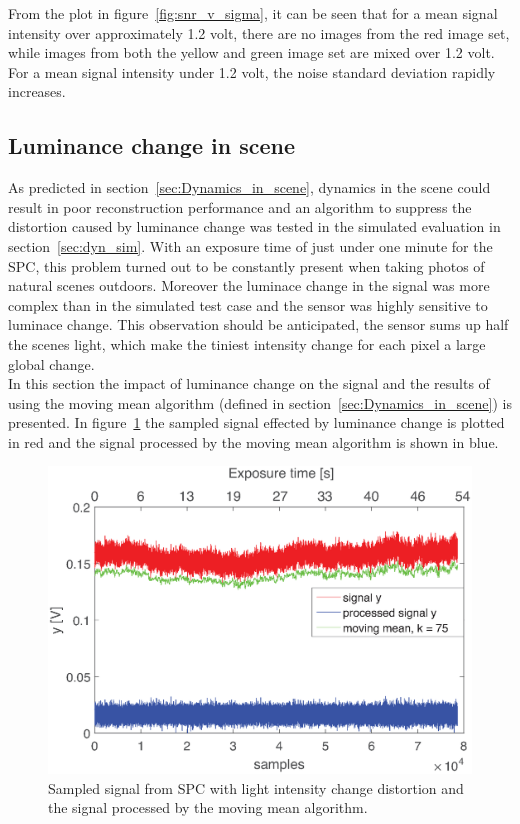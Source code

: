 From the plot in figure~\ref{fig:snr_v_sigma}, it can be seen that for a mean signal intensity over approximately 1.2 volt, there are no images from the red image set, while images from both the yellow and green image set are mixed over 1.2 volt. For a mean signal intensity under 1.2 volt, the noise standard deviation rapidly increases.


\subsection{Luminance change in scene}
As predicted in section~\ref{sec:Dynamics_in_scene}, dynamics in the scene could result in poor reconstruction performance and an algorithm to suppress the distortion caused by luminance change was tested in the simulated evaluation in section~\ref{sec:dyn_sim}. With an exposure time of just under one minute for the SPC, this problem turned out to be constantly present when taking photos of natural scenes outdoors. Moreover the luminace change in the signal was more complex than in the simulated test case and the sensor was highly sensitive to luminace change. This observation should be anticipated, the sensor sums up half the scenes light, which make the tiniest intensity change for each pixel a large global change.\\[0.1in] 

In this section the impact of luminance change on the signal and the results of using the moving mean algorithm (defined in section~\ref{sec:Dynamics_in_scene}) is presented. In figure~\ref{fig:lc_plot} the sampled signal effected by luminance change is plotted in red and the signal processed by the moving mean algorithm is shown in blue. 



\begin{figure}[H]
\centering
\includegraphics[width = 0.8\linewidth]{result/luminance/li.eps}
	\caption{Sampled signal from SPC with light intensity change distortion and the signal processed by the moving mean algorithm.}
	\label{fig:lc_plot}
\end{figure}



